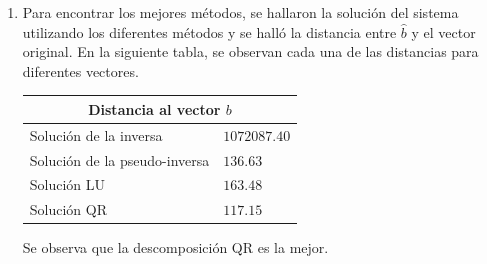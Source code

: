 \documentclass[fleqn]{article}
\begin{document}
\begin{enumerate}
\begin{multicols}{2}
\begin{equation*}
      \end{equation*}
    \end{multicols}
    \vspace{-1cm}
    \begin{equation*}
      \Theta_3 =
      \begin{bmatrix}
        0 & 0 & 0 & 1\\
        0 & 0 & 1 & 0\\
        1 & 0 & 0 & 0\\
        0 & 1 & 0 & 0
      \end{bmatrix}
    \end{equation*}
    En las siguientes gráficas se observa la norma de la matriz original
    comparada con la norma de la matriz desplazada. Se puede observar que estas
    normas tienen dependencia lineal y son iguales.
    \begin{figure}
      \centering
      \begin{subfigure}[b]{0.45\textwidth}
        \centering \texttt{[image: figs/exercise-5-sin]}
        \caption{Norma utilizando $\Theta_{1}$.}
      \end{subfigure}
      \begin{subfigure}[b]{0.45\textwidth}
        \centering \texttt{[image: figs/exercise-5-reflection]}
        \caption{Norma utilizando $\Theta_{2}$.}
      \end{subfigure}

      \begin{subfigure}[b]{0.45\textwidth}
        \centering \texttt{[image: figs/exercise-5-perm]}
        \caption{Norma utilizando $\Theta_{3}$.}
      \end{subfigure}
    \end{figure}

  \item Para encontrar los mejores métodos, se hallaron la solución del sistema
    utilizando los diferentes métodos y se halló la distancia entre $\hat{b}$ y
    el vector original. En la siguiente tabla, se observan cada una de las
    distancias para diferentes vectores.
    \begin{table}[H]
      \centering
      \begin{tabular}{ll}
        \hline
        \multicolumn{2}{c}{\textbf{Distancia al vector $b$}} \\ \hline
        Solución de la inversa   & $1072087.40$   \\
        Solución de la pseudo-inversa   & $136.63$    \\
        Solución LU & $163.48$ \\
        Solución QR & $117.15$ \\ \hline
      \end{tabular}
    \end{table}
    Se observa que la descomposición QR es la mejor.


\end{enumerate}
\end{document}
